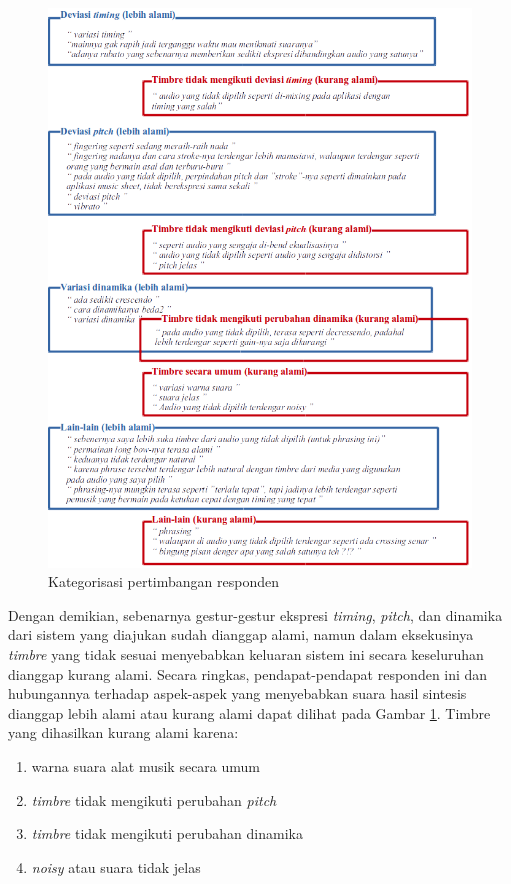 \begin{figure}[htbp]
    \centering
    \includegraphics[width=\textwidth]{resources/pertimbangan-categories.png}
    \caption{Kategorisasi pertimbangan responden}\label{fig-pertimbangan-categories}
\end{figure}

Dengan demikian, sebenarnya gestur-gestur ekspresi \textit{timing}, \textit{pitch}, dan dinamika dari sistem yang diajukan sudah dianggap alami, namun dalam eksekusinya \textit{timbre} yang tidak sesuai menyebabkan keluaran sistem ini secara keseluruhan dianggap kurang alami. Secara ringkas, pendapat-pendapat responden ini dan hubungannya terhadap aspek-aspek yang menyebabkan suara hasil sintesis dianggap lebih alami atau kurang alami dapat dilihat pada Gambar \ref{fig-pertimbangan-categories}. Timbre yang dihasilkan kurang alami karena:

\begin{enumerate}
	\item warna suara alat musik secara umum
	\item \textit{timbre} tidak mengikuti perubahan \textit{pitch}
	\item \textit{timbre} tidak mengikuti perubahan dinamika
	\item \textit{noisy} atau suara tidak jelas
\end{enumerate}

